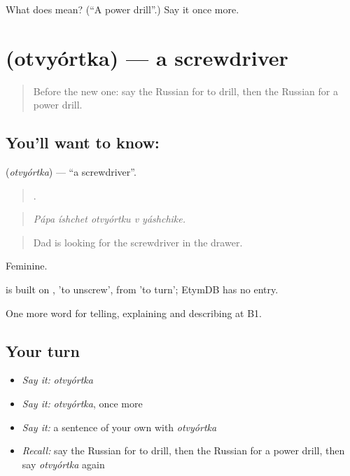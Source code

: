 \begin{tcolorbox}[breakable,colback=teal!4,colframe=teal!35!black,title={Before you move on}]
What does  mean? (\textquotedblleft{}A power drill\textquotedblright{}.) Say it once more.
\end{tcolorbox}
\section[\texorpdfstring{\ru{отвёртка} (otvyórtka)}{отвёртка (otvyórtka)}]{ (otvyórtka) — a screwdriver}

\label{lesson:RU-C532-otvyortka}



\begin{quote}
Before the new one: say the Russian for to drill, then the Russian for a power drill.
\end{quote}

\subsection*{You'll want to know: }
\textbf{} (\emph{otvyórtka}) — \textquotedblleft{}a screwdriver\textquotedblright{}.

\begin{quote}
    .
\end{quote}

\begin{quote}
\emph{Pápa íshchet otvyórtku v yáshchike.}
\end{quote}

\begin{quote}
Dad is looking for the screwdriver in the drawer.
\end{quote}

Feminine.

\begin{cousinweb}
\emph{} is built on \emph{}, \emph{} 'to unscrew', from \emph{} 'to turn'; EtymDB has no entry.
\end{cousinweb}

\begin{grammarlens}[title={What you've built}]
One more word for telling, explaining and describing at B1.
\end{grammarlens}

\subsection*{Your turn}
\begin{itemize}
\raggedright
  \item \emph{Say it:} \emph{otvyórtka}
  \item \emph{Say it:} \emph{otvyórtka}, once more
  \item \emph{Say it:} a sentence of your own with \emph{otvyórtka}
  \item \emph{Recall:} say the Russian for to drill, then the Russian for a power drill, then say \emph{otvyórtka} again
\end{itemize}

